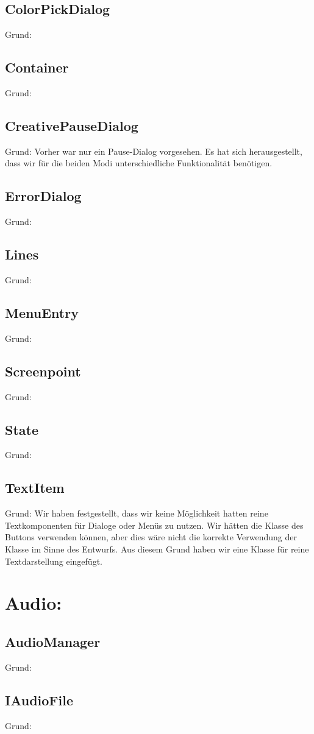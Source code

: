 \subsection{ColorPickDialog}
Grund:
\subsection{Container}
Grund:
\subsection{CreativePauseDialog}
Grund: Vorher war nur ein Pause-Dialog vorgesehen. Es hat sich herausgestellt, dass wir für die beiden Modi unterschiedliche Funktionalität benötigen.
\subsection{ErrorDialog}
Grund:
\subsection{Lines}
Grund:
\subsection{MenuEntry}
Grund:
\subsection{Screenpoint}
Grund:
\subsection{State}
Grund:
\subsection{TextItem}
Grund: Wir haben festgestellt, dass wir keine Möglichkeit hatten reine Textkomponenten für Dialoge oder Menüs zu nutzen. Wir hätten die Klasse des Buttons verwenden können, aber dies wäre nicht die korrekte Verwendung der Klasse im Sinne des Entwurfs. Aus diesem Grund haben wir eine Klasse für reine Textdarstellung eingefügt.

\section{Audio:}
\subsection{AudioManager}
Grund:
\subsection{IAudioFile}
Grund:
